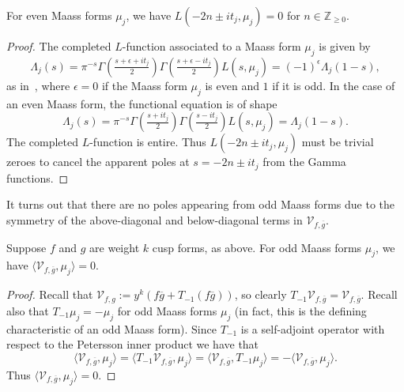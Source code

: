 \begin{lemma}\label{lem:Litj_equals_zero}
  For even Maass forms $\mu_j$, we have $L(-2n \pm it_j, \mu_j) = 0$ for $n \in
  \mathbb{Z}_{\geq 0}$.
\end{lemma}


\begin{proof}
  The completed $L$-function associated to a Maass form $\mu_j$ is given by
  \begin{equation} \label{eq:feq}
    \Lambda_j(s) = \pi^{-s} \Gamma\left( \tfrac{s + \epsilon + it_j}{2}
    \right)\Gamma\left( \tfrac{s + \epsilon - it_j}{2} \right) L(s, \mu_j) = (-1)^\epsilon
    \Lambda_j(1-s),
  \end{equation}
  as in~\cite[Sec 3.13]{Goldfeld2006automorphic}, where $\epsilon = 0$ if the Maass form
  $\mu_j$ is even and $1$ if it is odd.
  In the case of an even Maass form, the functional equation is of shape
  \begin{equation}
    \Lambda_j(s) = \pi^{-s} \Gamma\left( \tfrac{s + it_j}{2} \right)\Gamma\left( \tfrac{s
    - it_j}{2} \right) L(s, \mu_j) = \Lambda_j(1-s).
  \end{equation}
  The completed $L$-function is entire.
  Thus $L(-2n \pm it_j, \mu_j)$ must be trivial zeroes to cancel the apparent poles at $s
  =-2n \pm it_j$ from the Gamma functions.
\end{proof}


It turns out that there are no poles appearing from odd Maass forms due to the symmetry of
the above-diagonal and below-diagonal terms in $\mathcal{V}_{f, \overline{g}}$.


\begin{lemma}\label{lem:oddorthogonaltoeven}
  Suppose $f$ and $g$ are weight $k$ cusp forms, as above. For odd Maass forms $\mu_j$, we
  have $\langle \mathcal{V}_{f,\overline{g}}, \mu_j \rangle = 0$.
\end{lemma}


\begin{proof}
  Recall that $\mathcal{V}_{f,g} :=y^k(f\overline{g}+T_{-1}(f\overline{g}))$, so clearly
  $T_{-1}\mathcal{V}_{f,\overline{g} }=\mathcal{V}_{f,\overline{g} }$.
  Recall also that $T_{-1} \mu_j = -\mu_j$ for odd Maass forms $\mu_j$ (in fact, this is
  the defining characteristic of an odd Maass form).
  Since $T_{-1}$ is a self-adjoint operator with respect to the Petersson inner product we
  have that
  \begin{equation}
    \langle \mathcal{V}_{f,\overline{g} },\mu_j \rangle
    = \langle T_{-1}\mathcal{V}_{f,\overline{g} },\mu_j \rangle
    = \langle \mathcal{V}_{f,\overline{g} },T_{-1}\mu_j \rangle
    = - \langle \mathcal{V}_{f,\overline{g} },\mu_j \rangle.
  \end{equation}
  Thus $\langle \mathcal{V}_{f,\overline{g} },\mu_j \rangle  =0$.
\end{proof}


